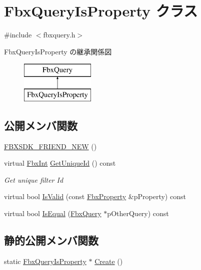 \hypertarget{class_fbx_query_is_property}{}\section{Fbx\+Query\+Is\+Property クラス}
\label{class_fbx_query_is_property}


{\ttfamily \#include $<$fbxquery.\+h$>$}

Fbx\+Query\+Is\+Property の継承関係図\begin{figure}[H]
\begin{center}
\leavevmode
\includegraphics[height=2.000000cm]{class_fbx_query_is_property}
\end{center}
\end{figure}
\subsection*{公開メンバ関数}
\begin{DoxyCompactItemize}
\item 
\hyperlink{class_fbx_query_is_property_af871937df7d2a293b46aa2e0fa7a481a}{F\+B\+X\+S\+D\+K\+\_\+\+F\+R\+I\+E\+N\+D\+\_\+\+N\+EW} ()
\item 
virtual \hyperlink{fbxtypes_8h_a088fa96de3b0b3ea69f0f6afef525dfb}{Fbx\+Int} \hyperlink{class_fbx_query_is_property_a390fb64587424e7d16cb4966566aee80}{Get\+Unique\+Id} () const
\begin{DoxyCompactList}\small\item\em Get unique filter Id \end{DoxyCompactList}\item 
virtual bool \hyperlink{class_fbx_query_is_property_a6f9680d513428cba6321203c9b3da71e}{Is\+Valid} (const \hyperlink{class_fbx_property}{Fbx\+Property} \&p\+Property) const
\item 
virtual bool \hyperlink{class_fbx_query_is_property_ace0b3dd62cc2614acc88ad892849416b}{Is\+Equal} (\hyperlink{class_fbx_query}{Fbx\+Query} $\ast$p\+Other\+Query) const
\end{DoxyCompactItemize}
\subsection*{静的公開メンバ関数}
\begin{DoxyCompactItemize}
\item 
static \hyperlink{class_fbx_query_is_property}{Fbx\+Query\+Is\+Property} $\ast$ \hyperlink{class_fbx_query_is_property_a9f9b91b8ea513a71c28d4e66654fb47f}{Create} ()
\end{DoxyCompactItemize}
